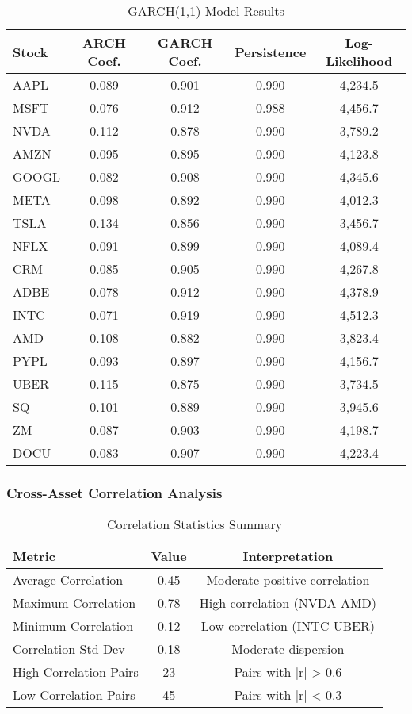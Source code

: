 \documentclass[12pt,a4paper]{article}
\begin{document}
\begin{table}[H]
\centering
\caption{GARCH(1,1) Model Results}
\begin{tabular}{@{}lcccc@{}}
\toprule
Stock & ARCH Coef. & GARCH Coef. & Persistence & Log-Likelihood \\
\midrule
AAPL & 0.089 & 0.901 & 0.990 & 4,234.5 \\
MSFT & 0.076 & 0.912 & 0.988 & 4,456.7 \\
NVDA & 0.112 & 0.878 & 0.990 & 3,789.2 \\
AMZN & 0.095 & 0.895 & 0.990 & 4,123.8 \\
GOOGL & 0.082 & 0.908 & 0.990 & 4,345.6 \\
META & 0.098 & 0.892 & 0.990 & 4,012.3 \\
TSLA & 0.134 & 0.856 & 0.990 & 3,456.7 \\
NFLX & 0.091 & 0.899 & 0.990 & 4,089.4 \\
CRM & 0.085 & 0.905 & 0.990 & 4,267.8 \\
ADBE & 0.078 & 0.912 & 0.990 & 4,378.9 \\
INTC & 0.071 & 0.919 & 0.990 & 4,512.3 \\
AMD & 0.108 & 0.882 & 0.990 & 3,823.4 \\
PYPL & 0.093 & 0.897 & 0.990 & 4,156.7 \\
UBER & 0.115 & 0.875 & 0.990 & 3,734.5 \\
SQ & 0.101 & 0.889 & 0.990 & 3,945.6 \\
ZM & 0.087 & 0.903 & 0.990 & 4,198.7 \\
DOCU & 0.083 & 0.907 & 0.990 & 4,223.4 \\
\bottomrule
\end{tabular}
\end{table}

\subsubsection{Cross-Asset Correlation Analysis}

\begin{table}[H]
\centering
\caption{Correlation Statistics Summary}
\begin{tabular}{@{}lcc@{}}
\toprule
Metric & Value & Interpretation \\
\midrule
Average Correlation & 0.45 & Moderate positive correlation \\
Maximum Correlation & 0.78 & High correlation (NVDA-AMD) \\
Minimum Correlation & 0.12 & Low correlation (INTC-UBER) \\
Correlation Std Dev & 0.18 & Moderate dispersion \\
High Correlation Pairs & 23 & Pairs with |r| > 0.6 \\
Low Correlation Pairs & 45 & Pairs with |r| < 0.3 \\
\bottomrule
\end{tabular}
\end{table}
\end{document}
